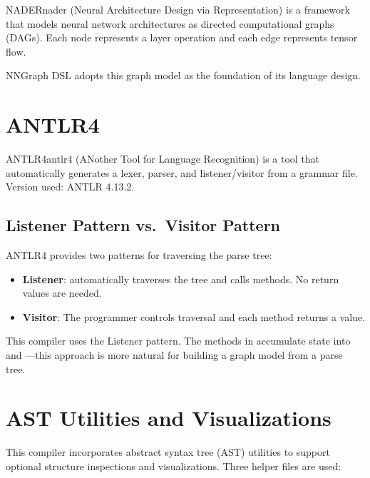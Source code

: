 \documentclass{nngraph-en}
\begin{document}
\begin{dfnbox}{NADER}{nader}
 (Neural Architecture Design via Representation) is a
framework that models neural network architectures as directed
computational graphs (DAGs). Each node represents a layer operation
and each edge represents tensor flow.
\end{dfnbox}

NNGraph DSL adopts this graph model as the foundation of its language
design.

\section{ANTLR4}

\begin{dfnbox}{ANTLR4}{antlr4}
 (ANother Tool for Language Recognition) is a tool
that automatically generates a lexer, parser, and listener/visitor
from a  grammar file.
Version used: ANTLR 4.13.2.
\end{dfnbox}

\subsection{Listener Pattern vs.\ Visitor Pattern}

ANTLR4 provides two patterns for traversing the parse tree:

\begin{itemize}
    \item \textbf{Listener}:  automatically
    traverses the tree and calls  methods. No
    return values are needed.
    \item \textbf{Visitor}: The programmer controls traversal and
    each method returns a value.
\end{itemize}

\begin{notebox}
This compiler uses the Listener pattern. The  methods
in  accumulate state into 
and ---this approach is more natural for building
a graph model from a parse tree.
\end{notebox}

\section{AST Utilities and Visualizations}

This compiler incorporates abstract syntax tree (AST) utilities to support optional structure inspections and visualizations. Three helper files are used:
\end{document}
